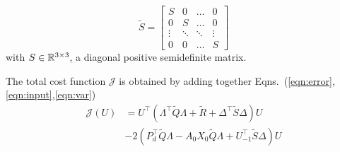 \begin{equation}
\tilde{S} = \begin{bmatrix}
S & 0& \ldots & 0 \\
0 & S & \ldots & 0 \\
\vdots & \ddots & \ddots & \vdots \\
0 & 0 & \ldots & S
\end{bmatrix}
\end{equation}
with $S \in {\mathbb R}^{3 \times 3}$, a diagonal positive semidefinite matrix.

The total cost function $\mathcal{J}$ is obtained by adding together Eqns.~(\ref{eqn:error},\ref{eqn:input},\ref{eqn:var})
\begin{equation}
\begin{aligned}
\mathcal{J}(U) &=  U^\top (\Lambda^{\top} \tilde{Q} \Lambda + \tilde{R} + \Delta^\top \tilde{S} \Delta) U \\
 & -2 (P_d^\top \tilde{Q} \Lambda -  A_0X_0 \tilde{Q} \Lambda + U_{-1}^\top \tilde{S} \Delta)U
\end{aligned}
\end{equation}	

